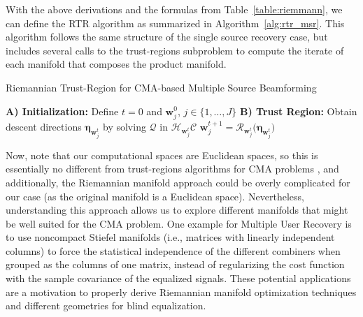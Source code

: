 With the above derivations and the formulas from Table~\ref{table:riemmann}, we can define the RTR algorithm as summarized in Algorithm~\ref{alg:rtr_msr}. This algorithm follows the same structure of the single source recovery case, but includes several calls to the trust-regions subproblem to compute the iterate of each manifold that composes the product manifold.
\begin{algorithm}[H]
	\caption{Riemannian Trust-Region for CMA-based Multiple Source Beamforming}
	\label{alg:rtr_msr}
	\begin{algorithmic}[1]
		\Statex \textbf{A) Initialization:} 
		\State Define $t=0$ and $\displaystyle \bm{w}_j^0$, $j\in\{1,\ldots,J\}$
		\Statex \textbf{B) Trust Region:}
		\State Obtain descent directions $\bm{\eta}_{\bm{w}_j^t}$ by solving $\mathcal{Q}$ in $\mathcal{H}_{\bm{w}_j^t}\mathcal{C}$
		\State $\displaystyle \bm{w}_{j}^{t+1}=\mathcal{R}_{\bm{w}_j^t}\big(\bm{\eta}_{\bm{w}_j^t}\big)$
		\EndFor
		\EndWhile
	\end{algorithmic}
\end{algorithm}

Now, note that our computational spaces are Euclidean spaces, so this is essentially no different from trust-regions algorithms for CMA problems \cite{Kreutz2008trustregionscma}, and additionally, the Riemannian manifold approach could be overly complicated for our case (as the original manifold is a Euclidean space). Nevertheless, understanding this approach allows us to explore different manifolds that might be well suited for the CMA problem. One example for Multiple User Recovery is to use noncompact Stiefel manifolds (i.e., matrices with linearly independent columns) to force the statistical independence of the different combiners when grouped as the columns of one matrix, instead of regularizing the cost function with the sample covariance of the equalized signals. These potential applications are a motivation to properly derive Riemannian manifold optimization techniques and different geometries for blind equalization.



